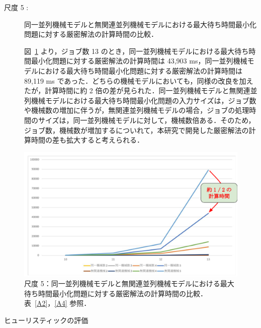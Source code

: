 \documentclass[12pt]{optlab-bachelor}
\begin{document}
\begin{description}
  \item[尺度 5 :] 同一並列機械モデルと無関連並列機械モデルにおける最大待ち時間最小化問題に対する厳密解法の計算時間の比較．

  図~\ref{5.5} より，ジョブ数 13 のとき，同一並列機械モデルにおける最大待ち時間最小化問題に対する厳密解法の計算時間は 43,903 ms，同一並列機械モデルにおける最大待ち時間最小化問題に対する厳密解法の計算時間は 89,119 ms であった．どちらの機械モデルにおいても，同様の改良を加えたが，計算時間に約 2 倍の差が見られた．同一並列機械モデルと無関連並列機械モデルにおける最大待ち時間最小化問題の入力サイズは，ジョブ数や機械数の増加に伴うが，無関連並列機械モデルの場合，ジョブの処理時間のサイズは，同一並列機械モデルに対して，機械数倍ある．そのため，ジョブ数，機械数が増加するについれて，本研究で開発した厳密解法の計算時間の差も拡大すると考えられる．
\end{description}
\begin{figure}[ht]
  \centering
  \includegraphics[width = 14cm]{figure/modelTimeComparison.pdf}
  \caption{尺度 5：同一並列機械モデルと無関連並列機械モデルにおける最大待ち時間最小化問題に対する厳密解法の計算時間の比較．表~\ref{A2}，\ref{A4} 参照．}
  \label{5.5}
\end{figure}

\begin{description}
  \item[ヒューリスティックの評価] ~
\end{description}
\end{document}
